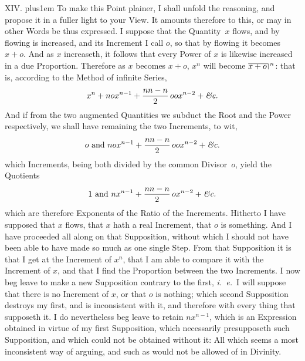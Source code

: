 \medbreak

XIV. \hskip 0pt plus1em
To make this Point plainer, I shall unfold the reasoning, and
propose it in a fuller light to your View.  It amounts therefore
to this, or may in other Words be thus expressed.  I suppose that
the Quantity~$x$ flows, and by flowing is increased, and its
Increment I call $o$, so that by flowing it becomes $x + o$.  And
as $x$ increaseth, it follows that every Power of $x$ is likewise
increased in a due Proportion.  Therefore as $x$ becomes $x + o$,
$x^n$ will become
$\mathord{\vbox{\hrule\hbox{$x + o \,$\vrule}}\,}^n$:
that is, according to the Method of infinite Series,
$$x^n + nox^{n-1} + {nn-n \over 2} \, oox^{n-2}
   + \hbox{\it \&c.}$$
And if from the two augmented Quantities we subduct the Root and
the Power respectively, we shall have remaining the two
Increments, to wit,
$$o \hbox{ and }
   nox^{n-1} + {nn-n \over 2} \, oox^{n-2} + \hbox{\it \&c.}$$
which Increments, being both divided by the common Divisor~$o$,
yield the Quotients
$$1 \hbox{ and }
   nx^{n-1} + {nn-n \over 2} \, ox^{n-2} + \hbox{\it \&c.}$$
which are therefore Exponents of the Ratio of the Increments.
Hitherto I have supposed that $x$ flows, that $x$ hath a real
Increment, that $o$ is something.  And I have proceeded all along
on that Supposition, without which I should not have been able to
have made so much as one single Step.  From that Supposition it
is that I get at the Increment of $x^n$, that I am able to
compare it with the Increment of $x$, and that I find the
Proportion between the two Increments.  I now beg leave to make a
new Supposition contrary to the first, {\it i.~e.}\ I will
suppose that there is no Increment of $x$, or that $o$ is
nothing; which second Supposition destroys my first, and is
inconsistent with it, and therefore with every thing that
supposeth it.  I do nevertheless beg leave to retain $nx^{n-1}$,
which is an Expression obtained in virtue of my first
Supposition, which necessarily presupposeth such Supposition,
and which could not be obtained without it: All which seems a
most inconsistent way of arguing, and such as would not be
allowed of in Divinity.

\medbreak

